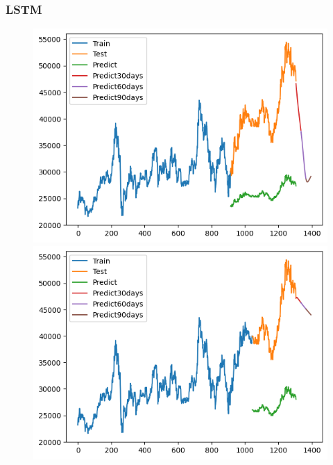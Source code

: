 \subsubsection{LSTM}
\begin{figure}[H]
    \centering
    \begin{minipage}{0.15\textwidth}
    \centering
    \includegraphics[width=1\textwidth]{resources/chapter-5/newdata1/result/BIDV_LSTM_7-3.png}
    \end{minipage}
    \hfill
    \begin{minipage}{0.15\textwidth}
    \centering
    \includegraphics[width=1\textwidth]{resources/chapter-5/newdata1/result/BIDV_LSTM_8-2.png}
    \end{minipage}
    \hfill
        \begin{minipage}{0.15\textwidth}

\end{minipage}
\end{figure}

